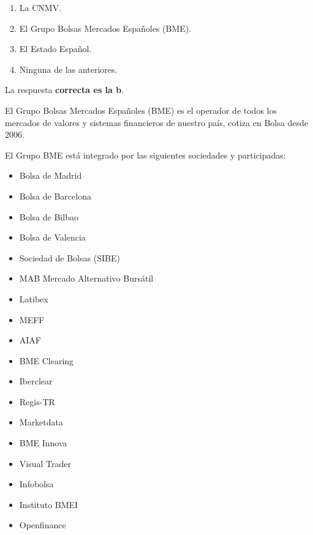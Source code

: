 \documentclass[
  letterpaper,
  DIV=11,
  numbers=noendperiod]{scrreprt}
\begin{document}
\begin{enumerate}
\def\labelenumi{\alph{enumi})}
\item
  La CNMV.
\item
  El Grupo Bolsas Mercados Españoles (BME).
\item
  El Estado Español.
\item
  Ninguna de las anteriores.
\end{enumerate}

\begin{tcolorbox}[enhanced jigsaw, left=2mm, opacityback=0, colback=white, breakable, arc=.35mm, bottomrule=.15mm, rightrule=.15mm, toprule=.15mm, leftrule=.75mm, colframe=quarto-callout-tip-color-frame]
\begin{minipage}[t]{5.5mm}
\textcolor{quarto-callout-tip-color}{\faLightbulb}
\end{minipage}%
\begin{minipage}[t]{\textwidth - 5.5mm}

La respuesta \textbf{correcta es la b}.

El Grupo Bolsas Mercados Españoles (BME) es el operador de todos los
mercados de valores y sistemas financieros de nuestro país, cotiza en
Bolsa desde 2006.

El Grupo BME está integrado por las siguientes sociedades y
participadas:

\begin{itemize}
\item
  Bolsa de Madrid
\item
  Bolsa de Barcelona
\item
  Bolsa de Bilbao
\item
  Bolsa de Valencia
\item
  Sociedad de Bolsas (SIBE)
\item
  MAB Mercado Alternativo Bursátil
\item
  Latibex
\item
  MEFF
\item
  AIAF
\item
  BME Clearing
\item
  Iberclear
\item
  Regis-TR
\item
  Marketdata
\item
  BME Innova
\item
  Visual Trader
\item
  Infobolsa
\item
  Instituto BMEI
\item
  Openfinance
\end{itemize}

\end{minipage}%
\end{tcolorbox}
\end{document}
